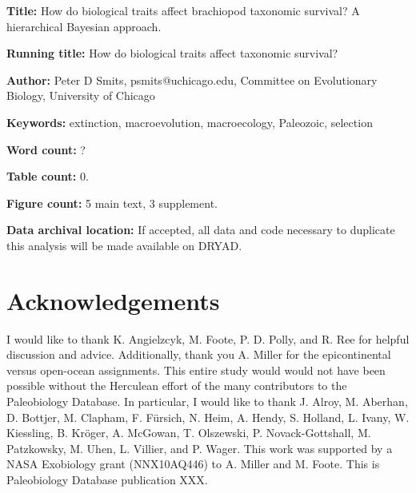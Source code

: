 \documentclass{article}
\begin{document}
\linenumbers
\modulolinenumbers[2]


\begin{titlepage}
  \begin{large}
    \textbf{Title:} How do biological traits affect brachiopod taxonomic survival? A hierarchical Bayesian approach.
  \end{large}

  \textbf{Running title:} How do biological traits affect taxonomic survival?

  \textbf{Author:} Peter D Smits, psmits@uchicago.edu, Committee on Evolutionary Biology, University of Chicago

  \textbf{Keywords:} extinction, macroevolution, macroecology, Paleozoic, selection

  \textbf{Word count:} ?
  
  \textbf{Table count:} 0.
 
  \textbf{Figure count:} 5 main text, 3 supplement.

  \textbf{Data archival location:} If accepted, all data and code necessary to duplicate this analysis will be made available on DRYAD.

\end{titlepage}











\section*{Acknowledgements}
I would like to thank K. Angielzcyk, M. Foote, P. D. Polly, and R. Ree for helpful discussion and advice. Additionally, thank you A. Miller for the epicontinental versus open-ocean assignments. This entire study would would not have been possible without the Herculean effort of the many contributors to the Paleobiology Database. In particular, I would like to thank J. Alroy, M. Aberhan, D. Bottjer, M. Clapham, F. F\"{u}rsich, N. Heim, A. Hendy, S. Holland, L. Ivany, W. Kiessling, B. Kr\"{o}ger, A. McGowan, T. Olszewski, P. Novack-Gottshall, M. Patzkowsky, M. Uhen, L. Villier, and P. Wager. This work was supported by a NASA Exobiology grant (NNX10AQ446) to A. Miller and M. Foote. This is Paleobiology Database publication XXX.
\end{document}
